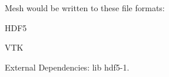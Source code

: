 Mesh would be written to these file formats\-:
\begin{DoxyEnumerate}
\item H\-D\-F5
\item V\-T\-K
\end{DoxyEnumerate}

External Dependencies\-: lib hdf5-\/1. 